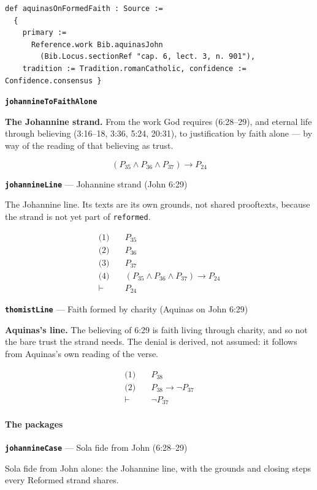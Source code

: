 \documentclass[11pt]{article}
\begin{document}
{\small\begin{verbatim}
def aquinasOnFormedFaith : Source :=
  {
    primary :=
      Reference.work Bib.aquinasJohn
        (Bib.Locus.sectionRef "cap. 6, lect. 3, n. 901"),
    tradition := Tradition.romanCatholic, confidence := Confidence.consensus }
\end{verbatim}}
\par\medskip\noindent\textbf{\texttt{johannine\allowbreak{}To\allowbreak{}Faith\allowbreak{}Alone}}\par\nobreak\noindent
\textbf{The Johannine strand.} From the work God requires (6:28–29), and eternal life through believing (3:16–18, 3:36, 5:24, 20:31), to justification by faith alone — by way of the reading of that believing as trust.

\[(P_{35} \land P_{36} \land P_{37}) \rightarrow P_{24}\]
\par\medskip\noindent\textbf{\texttt{johannine\allowbreak{}Line}} --- Johannine strand (John 6:29)\par\nobreak\noindent
The Johannine line. Its texts are its own grounds, not shared prooftexts, because the strand is not yet part of \texttt{reformed}.

\begin{align*}
  \text{(1)} \quad & P_{35} \\
  \text{(2)} \quad & P_{36} \\
  \text{(3)} \quad & P_{37} \\
  \text{(4)} \quad & (P_{35} \land P_{36} \land P_{37}) \rightarrow P_{24} \\
  \vdash \quad & P_{24}
\end{align*}
\par\medskip\noindent\textbf{\texttt{thomist\allowbreak{}Line}} --- Faith formed by charity (Aquinas on John 6:29)\par\nobreak\noindent
\textbf{Aquinas's line.} The believing of 6:29 is faith living through charity, and so not the bare trust the strand needs. The denial is derived, not assumed: it follows from Aquinas's own reading of the verse.

\begin{align*}
  \text{(1)} \quad & P_{38} \\
  \text{(2)} \quad & P_{38} \rightarrow \lnot P_{37} \\
  \vdash \quad & \lnot P_{37}
\end{align*}
\paragraph*{The packages}
\leavevmode\par
\par\medskip\noindent\textbf{\texttt{johannine\allowbreak{}Case}} --- Sola fide from John (6:28–29)\par\nobreak\noindent
Sola fide from John alone: the Johannine line, with the grounds and closing steps every Reformed strand shares.
\end{document}
